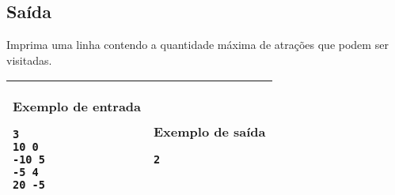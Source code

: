 \subsection*{Saída}

Imprima uma linha contendo a quantidade máxima de atrações que podem ser
visitadas.

\begin{table}[!h]
\centering
\begin{tabular}{|l|l|}
\hline
\begin{minipage}[t]{3in}
\textbf{Exemplo de entrada}
\begin{verbatim}
3
10 0
-10 5
-5 4
20 -5
\end{verbatim}
\vspace{1mm}
\end{minipage}
&

\begin{minipage}[t]{3in}
\textbf{Exemplo de saída}
\begin{verbatim}
2
\end{verbatim}
\vspace{1mm}
\end{minipage} \\
\hline
\end{tabular}
\end{table}
